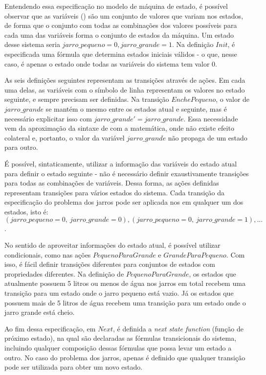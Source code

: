 Entendendo essa especificação no modelo de máquina de estado, é possível observar que as variáveis (\VARIABLES) são um conjunto de valores que variam nos estados, de forma que o conjunto com todas as combinações dos valores possíveis para cada uma das variáveis forma o conjunto de estados da máquina. Um estado desse sistema seria $jarro\_pequeno = 0, jarro\_grande = 1$. Na definição $Init$, é especificada uma fórmula que determina estados iniciais válidos - o que, nesse caso, é apenas o estado onde todas as variáveis do sistema tem valor 0.

As seis definições seguintes representam as transições através de ações. Em cada uma delas, as variáveis com o símbolo de linha representam os valores no estado seguinte, e sempre precisam ser definidas. Na transição $EnchePequeno$, o valor de $jarro\_grande$ se mantém o mesmo entre os estados atual e seguinte, mas é necessário explicitar isso com $jarro\_grande' = jarro\_grande$. Essa necessidade vem da aproximação da sintaxe de \TLA com a matemática, onde não existe efeito colateral e, portanto, o valor da variável $jarro\_grande$ não propaga de um estado para outro.

É possível, sintaticamente, utilizar a informação das variáveis do estado atual para definir o estado seguinte - não é necessário definir exaustivamente transições para todas as combinações de variáveis. Dessa forma, as ações definidas representam transições para vários estados do sistema. Cada transição da especificação do problema dos jarros pode ser aplicada nos em qualquer um dos estados, isto é: $(jarro\_pequeno = 0,\ jarro\_grande = 0), (jarro\_pequeno = 0,\ jarro\_grande = 1), \dots$.

No sentido de aproveitar informações do estado atual, é possível utilizar condicionais, como nas ações $PequenoParaGrande$ e $GrandeParaPequeno$. Com isso, é fácil definir transições diferentes para conjuntos de estados com propriedades diferentes. Na definição de $PequenoParaGrande$, os estados que atualmente possuem 5 litros ou menos de água nos jarros em total recebem uma transição para um estado onde o jarro pequeno está vazio. Já os estados que possuem mais de 5 litros de água recebem uma transição para um estado onde o jarro grande está cheio.

Ao fim dessa especificação, em $Next$, é definida a \textit{next state function} (função de próximo estado), na qual são declaradas as fórmulas transicionais do sistema, incluindo qualquer composição dessas fórmulas que possa levar um estado a outro. No caso do problema dos jarros, apenas é definido que qualquer transição pode ser utilizada para obter um novo estado.

